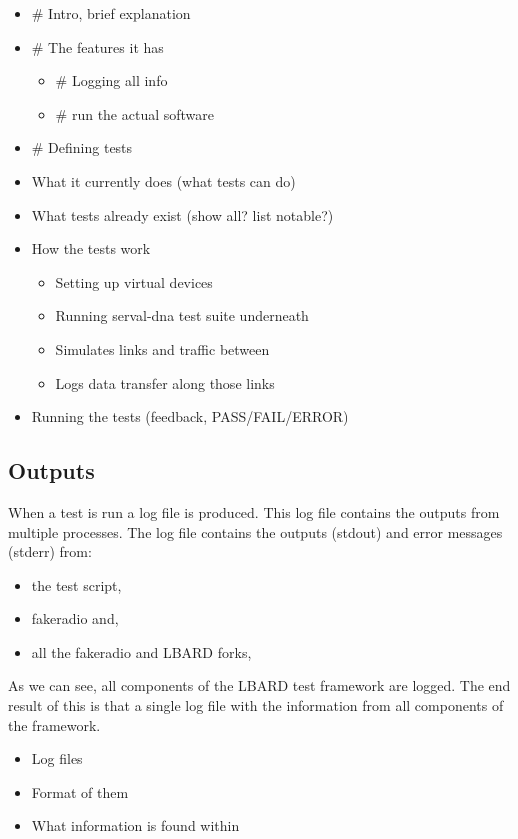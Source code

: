 \begin{itemize}
    \item \# Intro, brief explanation
    \item \# The features it has
    \begin{itemize}
        \item \# Logging all info
        \item \# run the actual software
    \end{itemize}
    \item \# Defining tests
    \item What it currently does (what tests can do)
    \item What tests already exist (show all? list notable?)
    \item How the tests work
    \begin{itemize}
        \item Setting up virtual devices
        \item Running serval-dna test suite underneath
        \item Simulates links and traffic between
        \item Logs data transfer along those links
    \end{itemize}
    \item Running the tests (feedback, PASS/FAIL/ERROR)
\end{itemize}


\subsection{Outputs}
When a test is run a log file is produced. 
This log file contains the outputs from multiple processes. 
The log file contains the outputs (stdout) and error messages (stderr) from: \begin{itemize}
    \item the test script,
    \item fakeradio and, 
    \item all the fakeradio and LBARD forks, 
\end{itemize}

As we can see, all components of the LBARD test framework are logged.
The end result of this is that a single log file with the information from all components of the framework.



\begin{itemize}
    \item Log files
    \item Format of them
    \item What information is found within
\end{itemize}



